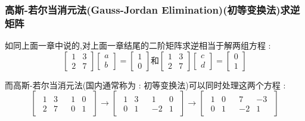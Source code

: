 \documentclass[UTF8,12pt]{ctexbook}
\newcommand{\mediumBigCase}[1]{\left[#1\right]}
\newcommand{\augmentedMatrix}[2]{
  \mediumBigCase{
    \begin{array}{c|c}
      #1 & #2
    \end{array}
    }
    }
\begin{document}
{{{{\subsubsection{高斯-若尔当消元法(Gauss-Jordan Elimination)(初等变换法)求逆矩阵}{
如同上面一章中说的,对上面一章结尾的二阶矩阵求逆相当于解两组方程 :
$$
  \begin{bmatrix}
    1 & 3 \\
    2 & 7
  \end{bmatrix}
  \begin{bmatrix}
    a \\
    b
  \end{bmatrix}
  =
  \begin{bmatrix}
    1 \\
    0
  \end{bmatrix}
  \mbox{和}
  \begin{bmatrix}
    1 & 3 \\
    2 & 7
  \end{bmatrix}
  \begin{bmatrix}
    c \\
    d
  \end{bmatrix}
  =
  \begin{bmatrix}
    0 \\
    1
  \end{bmatrix}
$$

而高斯-若尔当消元法(国内通常称为 : 初等变换法)可以同时处理这两个方程 :
$$
  \augmentedMatrix{
    \begin{matrix}
      1 & 3 \\
      2 & 7
    \end{matrix}
  }{
    \begin{matrix}
      1 & 0 \\
      0 & 1
    \end{matrix}
  }
  \to
  \augmentedMatrix{
    \begin{matrix}
      1 & 3 \\
      0 & 1
    \end{matrix}
  }{
    \begin{matrix}
      1  & 0 \\
      -2 & 1
    \end{matrix}
  }
  \to
  \augmentedMatrix{
    \begin{matrix}
      1 & 0 \\
      0 & 1
    \end{matrix}
  }{
    \begin{matrix}
      7  & -3 \\
      -2 & 1
    \end{matrix}
  }
$$

}}}}}
\end{document}
